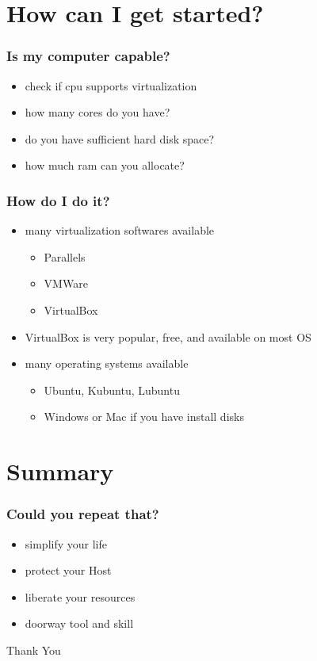 \documentclass{beamer}
\begin{document}
\section[Hands On]{How can I get started?}

\begin{frame}
    \frametitle{Is my computer capable?}
    \begin{itemize}
        \item check if cpu supports virtualization
        \item how many cores do you have?
        \item do you have sufficient hard disk space?
        \item how much ram can you allocate?
    \end{itemize}
\end{frame}

\begin{frame}
    \frametitle{How do I do it?}
    \begin{itemize}
        \item many virtualization softwares available
            \begin{itemize}
                \item Parallels
                \item VMWare
                \item VirtualBox
            \end{itemize}
        \item VirtualBox is very popular, free, and available on most OS
        \item many operating systems available
            \begin{itemize}
                \item Ubuntu, Kubuntu, Lubuntu
                \item Windows or Mac if you have install disks
            \end{itemize}
    \end{itemize}
\end{frame}

\section[Summary]{Summary}

\begin{frame}
    \frametitle{Could you repeat that?}
    \begin{itemize}
        \item simplify your life
        \item protect your Host
        \item liberate your resources
        \item doorway tool and skill
    \end{itemize}
\end{frame}

\begin{frame}
    \begin{center}
        Thank You
    \end{center}
\end{frame}
\end{document}
